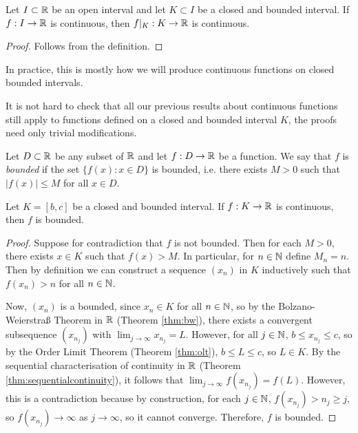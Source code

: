 \documentclass[../analysis1.tex]{subfiles}
\begin{document}
\begin{lemma}
    \begin{shaded*}
        Let $I\subset\mathbb{R}$ be an open interval and let $K\subset I$ be a closed and bounded interval. If $f:I\to\mathbb{R}$ is continuous, then $f|_K:K\to \mathbb{R}$ is continuous.
    \end{shaded*}
\end{lemma}
\begin{proof}
    Follows from the definition.\qedhere
\end{proof}

In practice, this is mostly how we will produce continuous functions on closed bounded
intervals.\par
It is not hard to check that all our previous results about continuous functions still apply to functions defined on a closed and bounded interval $K$, the proofs need only trivial modifications.

\begin{definition}
    \begin{shaded*}
        Let $D\subset \mathbb{R}$ be any subset of $\mathbb{R}$ and let $f:D\to\mathbb{R}$ be a function. We say that $f$ is \textit{bounded} if the set $\{f(x):x\in D\}$ is bounded, i.e. there exists $M>0$ such that $|f(x)|\le M$ for all $x\in D$.
    \end{shaded*}
\end{definition}

\begin{lemma}
\label{lem:functionbounded}
    \begin{shaded*}
        Let $K=[b,c]$ be a closed and bounded interval. If $f:K\to\mathbb{R}$ is continuous, then $f$ is bounded.
    \end{shaded*}
\end{lemma}
\begin{proof}
    Suppose for contradiction that $f$ is not bounded. Then for each $M>0$, there exists $x\in K$ such that $f(x)>M$. In particular, for $n\in\mathbb{N}$ define $M_n=n$. Then by definition we can construct a sequence $(x_n)$ in $K$ inductively such that $f(x_n)>n$ for all $n\in\mathbb{N}$.\par
    Now, $(x_n)$ is a bounded, since $x_n\in K$ for all $n\in\mathbb{N}$, so by the Bolzano-Weierstraß Theorem in $\mathbb{R}$ (Theorem \ref{thm:bw}), there exists a convergent subsequence $(x_{n_j})$ with $\lim_{j\to\infty}x_{n_j}=L$. However, for all $j\in\mathbb{N}$, $b\le x_{n_j}\le c$, so by the Order Limit Theorem (Theorem \ref{thm:olt}), $b\le L\le c$, so $L\in K$. By the sequential characterisation of continuity in $\mathbb{R}$ (Theorem \ref{thm:sequentialcontinuity}), it follows that $\lim_{j\to\infty}f(x_{n_j})=f(L)$. However, this is a contradiction because by construction, for each $j\in\mathbb{N}$, $f(x_{n_j})>n_j\ge j$, so $f(x_{n_j})\to\infty$ as $j\to\infty$, so it cannot converge. Therefore, $f$ is bounded.\qedhere
\end{proof}
\end{document}
